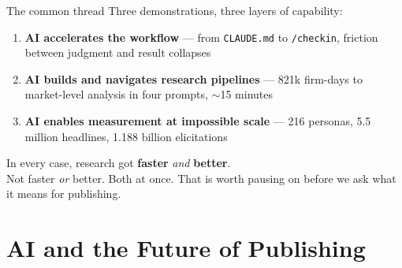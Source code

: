 \documentclass[aspectratio=169, 10pt]{beamer}
\begin{document}
\begin{frame}{The common thread}
  Three demonstrations, three layers of capability:
  \vspace{0.4em}
  \begin{enumerate}
    \setlength{\itemsep}{0.5em}
    \item \textbf{AI accelerates the workflow} --- from \texttt{CLAUDE.md}
          to \texttt{/checkin}, friction between judgment and result collapses
    \item \textbf{AI builds and navigates research pipelines} --- 821k
          firm-days to market-level analysis in four prompts, $\sim$15 minutes
    \item \textbf{AI enables measurement at impossible scale} --- 216 personas,
          5.5 million headlines, 1.188 billion elicitations
  \end{enumerate}
  \vspace{0.6em}
  \begin{findingbox}
    In every case, research got \textbf{faster} \textit{and} \textbf{better}.\\[0.2em]
    \small Not faster \textit{or} better. Both at once.
    That is worth pausing on before we ask what it means for publishing.
  \end{findingbox}
\end{frame}


\section{AI and the Future of Publishing}
\end{document}
